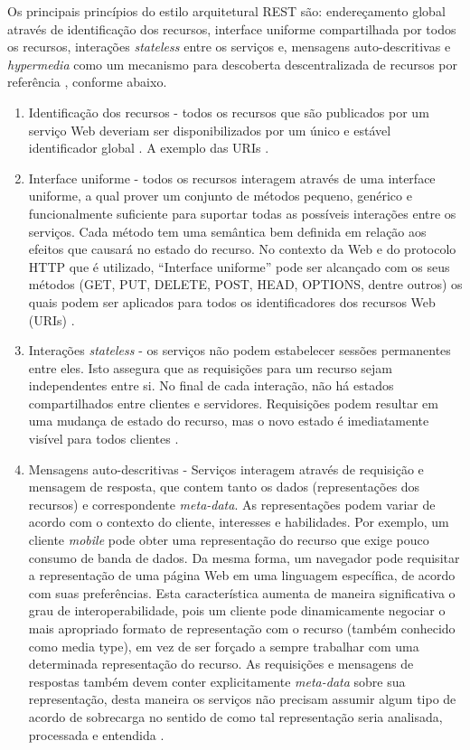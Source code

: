 Os principais princípios do estilo arquitetural REST são: endereçamento global através de identificação dos recursos, interface uniforme compartilhada por todos os recursos, interações \textit{stateless} entre os serviços e, mensagens auto-descritivas e \textit{hypermedia} como um mecanismo para descoberta descentralizada de recursos por referência \cite{Pautasso:2014}, conforme abaixo.

\begin{enumerate}
\item Identificação dos recursos - todos os recursos que são publicados por um serviço Web deveriam ser disponibilizados por um único e estável identificador global \cite{Pautasso:2014}. A exemplo das URIs \cite{Franca:2011}.
\item Interface uniforme - todos os recursos interagem através de uma interface uniforme, a qual prover um conjunto de métodos pequeno, genérico e funcionalmente suficiente para suportar todas as possíveis interações entre os serviços. Cada método tem uma semântica bem definida em relação aos efeitos que causará no estado do recurso. No contexto da Web e do protocolo HTTP que é utilizado, ``Interface uniforme'' pode ser alcançado com os seus  métodos (GET, PUT, DELETE, POST, HEAD, OPTIONS, dentre outros) os quais podem ser aplicados para todos os identificadores dos recursos Web (URIs) \cite{Pautasso:2014}.
\item Interações \textit{stateless} - os serviços não podem estabelecer sessões permanentes entre eles. Isto assegura que as requisições para um recurso sejam independentes entre si. No final de cada interação, não há estados compartilhados entre clientes e servidores. Requisições podem resultar em uma mudança de estado do recurso, mas o novo estado é imediatamente visível para todos clientes \cite{Pautasso:2014}.
\item Mensagens auto-descritivas - Serviços interagem através de requisição e mensagem de resposta, que contem tanto os dados (representações dos recursos) e correspondente \textit{meta-data}. As representações podem variar de acordo com o contexto do cliente, interesses e habilidades. Por exemplo, um cliente \textit{mobile} pode obter uma representação do recurso que exige pouco consumo de banda de dados. Da mesma forma, um navegador pode requisitar a representação de uma página Web em uma linguagem específica, de acordo com suas preferências. Esta característica aumenta de maneira significativa o grau de interoperabilidade, pois um cliente pode dinamicamente negociar o mais apropriado formato de representação com o recurso (também conhecido como media type), em vez de ser forçado a sempre trabalhar com uma determinada representação do recurso. As requisições e mensagens de respostas também devem conter explicitamente \textit{meta-data} sobre sua representação, desta maneira os serviços não precisam assumir algum tipo de acordo de sobrecarga no sentido de como tal representação seria analisada, processada e entendida \cite{Pautasso:2014}.

\end{enumerate}
